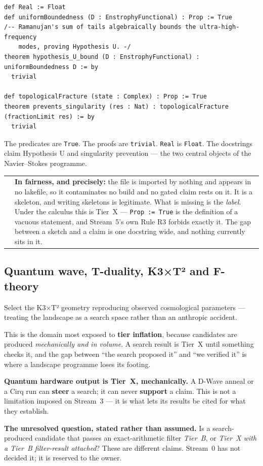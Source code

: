 \documentclass[11pt,a4paper]{article}
\makeatletter
\newcommand{\caveat}[1]{%
  \par\vspace{0.6em}\noindent
  \begin{tabular}{@{}p{0.4em}@{\hspace{0.8em}}p{\dimexpr\linewidth-2.2em\relax}@{}}
  \textcolor{rulegray}{\rule{2pt}{\baselineskip}} & \small #1
  \end{tabular}\par\vspace{0.6em}}
\makeatother
\begin{document}
\begin{lstlisting}[language=Lean]
def Real := Float
def uniformBoundedness (D : EnstrophyFunctional) : Prop := True
/-- Ramanujan's sum of tails algebraically bounds the ultra-high-frequency
    modes, proving Hypothesis U. -/
theorem hypothesis_U_bound (D : EnstrophyFunctional) : uniformBoundedness D := by
  trivial

def topologicalFracture (state : Complex) : Prop := True
theorem prevents_singularity (res : Nat) : topologicalFracture (fractionLimit res) := by
  trivial
\end{lstlisting}

The predicates are \texttt{True}. The proofs are \texttt{trivial}. \texttt{Real} is
\texttt{Float}. The docstrings claim Hypothesis U and singularity prevention — the two central
objects of the Navier–Stokes programme.

\caveat{\textbf{In fairness, and precisely:} the file is imported by nothing and appears in no
lakefile, so it contaminates no build and no gated claim rests on it. It is a skeleton, and
writing skeletons is legitimate. What is missing is the \emph{label}. Under the calculus this is
Tier~X — \texttt{Prop := True} is the definition of a vacuous statement, and Stream~5's own Rule
R3 forbids exactly it. The gap between a sketch and a claim is one docstring wide, and nothing
currently sits in it.}

\subsection{Quantum wave, T-duality, K3×T² and F-theory}

Select the K3×T² geometry reproducing observed cosmological parameters — treating the landscape
as a search space rather than an anthropic accident.

This is the domain most exposed to \textbf{tier inflation}, because candidates are produced
\emph{mechanically and in volume}. A search result is Tier~X until something checks it, and the
gap between ``the search proposed it'' and ``we verified it'' is where a landscape programme
loses its footing.

\textbf{Quantum hardware output is Tier~X, mechanically.} A D-Wave anneal or a Cirq run can
\textbf{steer} a search; it can never \textbf{support} a claim. This is not a limitation imposed
on Stream~3 — it is what lets its results be cited for what they establish.

\textbf{The unresolved question, stated rather than assumed.} Is a search-produced candidate that
passes an exact-arithmetic filter \emph{Tier~B}, or \emph{Tier~X with a Tier~B filter-result
attached}? These are different claims. Stream~0 has not decided it; it is reserved to the owner.
\end{document}

